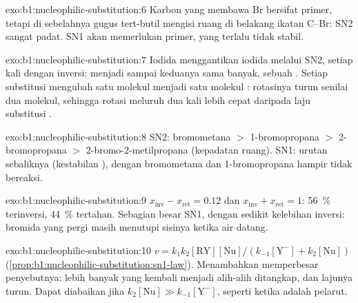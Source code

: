 \begin{solution}{exo:b1:nucleophilic-substitution:6}
Karbon yang membawa Br bersifat primer, tetapi di sebelahnya gugus
tert-butil mengisi ruang di belakang ikatan C--Br:  SN2
sangat padat. SN1 akan memerlukan  primer, yang terlalu tidak
stabil.
\end{solution}

\begin{solution}{exo:b1:nucleophilic-substitution:7}
Iodida menggantikan iodida melalui SN2, setiap kali dengan inversi:
 menjadi  sampai keduanya sama banyak, sebuah . Setiap substitusi mengubah satu molekul  menjadi satu
molekul : rotasinya turun senilai dua molekul, sehingga rotasi
meluruh dua kali lebih cepat daripada laju substitusi .
\end{solution}

\begin{solution}{exo:b1:nucleophilic-substitution:8}
SN2: bromometana $>$ 1-bromopropana $>$ 2-bromopropana $>$
2-bromo-2-metilpropana (kepadatan ruang). SN1: urutan sebaliknya
(kestabilan ), dengan bromometana dan 1-bromopropana hampir
tidak bereaksi.
\end{solution}

\begin{solution}{exo:b1:nucleophilic-substitution:9}
$x_{\text{inv}} - x_{\text{ret}} = 0.12$ dan $x_{\text{inv}} + x_{\text{ret}} = 1$:
\qty{56}{\percent} terinversi, \qty{44}{\percent} tertahan. Sebagian besar
 SN1, dengan sedikit kelebihan inversi: bromida yang pergi
masih menutupi sisinya ketika air datang.
\end{solution}

\begin{solution}{exo:b1:nucleophilic-substitution:10}
$v = k_1k_2[\mathrm{RY}][\mathrm{Nu}]/(k_{-1}[\mathrm{Y^-}] + k_2[\mathrm{Nu}])$
(\cref{prop:b1:nucleophilic-substitution:sn1-law}). Menambahkan 
memperbesar penyebutnya: lebih banyak  yang kembali menjadi
 alih-alih ditangkap, dan lajunya turun. Dapat diabaikan jika
$k_2[\mathrm{Nu}] \gg k_{-1}[\mathrm{Y^-}]$, seperti ketika 
adalah pelarut.
\end{solution}

